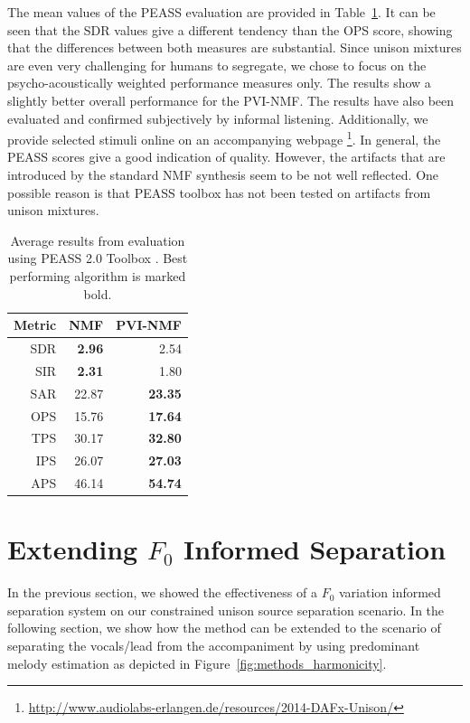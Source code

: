 The mean values of the PEASS evaluation are provided in Table~\ref{tab:results}. It can be seen that the SDR values give a different tendency than the OPS score, showing that the differences between both measures are substantial. Since unison mixtures are even very challenging for humans to segregate, we chose to focus on the psycho-acoustically weighted performance measures only. The results show a slightly better overall performance for the PVI-NMF.
The results have also been evaluated and confirmed subjectively by informal listening. Additionally, we provide selected stimuli online on an accompanying webpage \footnote{\url{http://www.audiolabs-erlangen.de/resources/2014-DAFx-Unison/}}. In general, the PEASS scores give a good indication of quality. However, the artifacts that are introduced by the standard NMF synthesis seem to be not well reflected. One possible reason is that PEASS toolbox has not been tested on artifacts from unison mixtures. \\

\begin{table}
\begin{center}
\small
\begin{tabular}{ r | r r }
  Metric & NMF & PVI-NMF \\
  \hline
  SDR & \textbf{2.96} & 2.54 \\
  SIR & \textbf{2.31} & 1.80 \\
  SAR & 22.87 & \textbf{23.35} \\
  \hline
  OPS & 15.76 & \textbf{17.64}\\
  TPS & 30.17 & \textbf{32.80}\\
  IPS & 26.07 & \textbf{27.03}\\
  APS & 46.14 & \textbf{54.74}\\
\end{tabular}
\end{center}
  \caption{Average results from evaluation using PEASS 2.0 Toolbox \cite{emiya11}. Best performing algorithm is marked bold.}
  \label{tab:results}
\end{table}

\section{Extending $F_0$ Informed Separation}%
\label{sec:extendingf0}

In the previous section, we showed the effectiveness of a \(F_0\) variation informed separation system on our constrained unison source separation scenario.
In the following section, we show how the method can be extended to the scenario of separating the vocals/lead from the accompaniment by using predominant melody estimation as depicted in Figure~\ref{fig:methods_harmonicity}.

